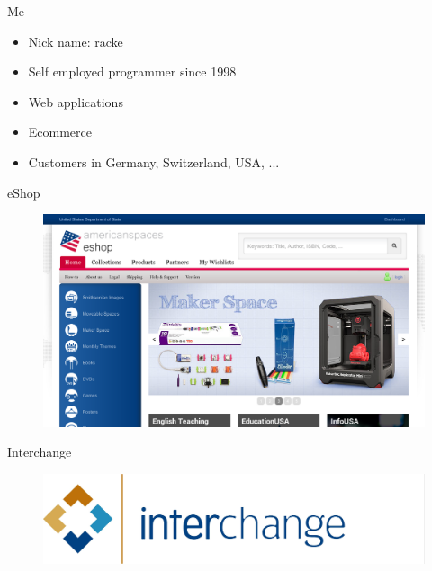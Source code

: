 

\begin{frame}{Me}
\begin{itemize}
\item Nick name: racke
\item Self employed programmer since 1998
\item Web applications
\item Ecommerce
\item Customers in Germany, Switzerland, USA, ...
\end{itemize}
\end{frame}


\begin{frame}{eShop}
\begin{figure}[!ht]
\centering
\includegraphics[width=1\linewidth]{img/eshop.png}
\end{figure}
\end{frame}

\begin{frame}{Interchange}
\begin{figure}[!ht]
\centering
\includegraphics[width=1\linewidth]{img/interchange.jpg}
\end{figure}
\end{frame}

